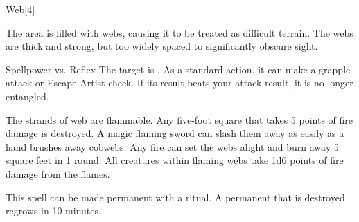 \begin{spellsection}{Web}[4]
    \begin{spellheader}
    \end{spellheader}
    \begin{spellcontent}
        \begin{spelltargetinginfo}
        \end{spelltargetinginfo}
        \begin{spelleffects}
            \spelleffect The area is filled with webs, causing it to be treated as difficult terrain. The webs are thick and strong, but too widely spaced to significantly obscure sight. %
            \spelldur \durshort \dismissable
        \end{spelleffects}
    \end{spellcontent}
    \begin{spellsubcontent}
        \begin{spelltargetinginfo}
        \end{spelltargetinginfo}
        \begin{spelleffects}
            \begin{spellattack}{Spellpower vs. Reflex}
                \spellsuccess The target is \immobilized. As a standard action, it can make a grapple attack or Escape Artist check. If its result beats your attack result, it is no longer entangled.
            \end{spellattack}
        \end{spelleffects}
    \end{spellsubcontent}
    \begin{spellfooter}
        \spellnotes The strands of web are flammable. Any five-foot square that takes 5 points of fire damage is destroyed. A magic flaming sword can slash them away as easily as a hand brushes away cobwebs. Any fire can set the webs alight and burn away 5 square feet in 1 round. All creatures within flaming webs take 1d6 points of fire damage from the flames.

        \physicalspellnotes

        This spell can be made permanent with a  ritual. A permanent  that is destroyed regrows in 10 minutes.
        \miscastyou
    \end{spellfooter}
\end{spellsection}

